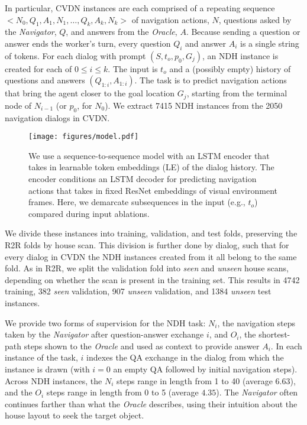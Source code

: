 \documentclass{article}
\newcommand{\dataset}{CVDN}
\newcommand{\task}{NDH}
\newcommand{\nav}{\textit{Navigator}}
\newcommand{\ora}{\textit{Oracle}}
\begin{document}
In particular, \dataset{} instances are each comprised of a repeating sequence ${<N_0, Q_1, A_1, N_1, \dots, Q_k, A_k, N_k>}$ of navigation actions, $N$, questions asked by the \nav{}, $Q$, and answers from the \ora{}, $A$.
Because sending a question or answer ends the worker's turn, every question $Q_i$ and answer $A_i$ is a single string of tokens.
For each dialog with prompt $(S, t_o, p_0, G_j)$, an \task{} instance is created for each of $0\leq i\leq k$.
The input is $t_o$ and a (possibly empty) history of questions and answers $(Q_{1:i}, A_{1:i})$.
The task is to predict navigation actions that bring the agent closer to the goal location $G_j$, starting from the terminal node of $N_{i-1}$ (or $p_0$, for $N_0$).
We extract 7415 \task{} instances from the 2050 navigation dialogs in \dataset{}.

\begin{figure}[ht]
\centering
\texttt{[image: figures/model.pdf]}
\caption{We use a sequence-to-sequence model with an LSTM encoder that takes in learnable token embeddings (LE) of the dialog history.
The encoder conditions an LSTM decoder for predicting navigation actions that takes in fixed ResNet embeddings of visual environment frames.
Here, we demarcate subsequences in the input (e.g., $t_o$) compared during input ablations.
}
\label{fig:model}
\vspace{-3mm}
\end{figure}

We divide these instances into training, validation, and test folds, preserving the R2R folds by house scan.
This division is further done by dialog, such that for every dialog in \dataset{} the \task{} instances created from it all belong to the same fold.
As in R2R, we split the validation fold into \textit{seen} and \textit{unseen} house scans, depending on whether the scan is present in the training set. This results in 4742 training, 382 \textit{seen} validation, 907 \textit{unseen} validation, and 1384 \textit{unseen} test instances.

We provide two forms of supervision for the \task{} task: $N_i$, the navigation steps taken by the \nav{} after question-answer exchange $i$, and $O_i$, the shortest-path steps shown to the \ora{} and used as context to provide answer $A_i$.
In each instance of the task, $i$ indexes the QA exchange in the dialog from which the instance is drawn (with $i=0$ an empty QA followed by initial navigation steps).
Across \task{} instances, the $N_i$ steps range in length from 1 to 40 (average $6.63$), and the $O_i$ steps range in length from 0 to 5 (average $4.35$).
The \nav{} often continues farther than what the \ora{} describes, using their intuition about the house layout to seek the target object.
\end{document}
